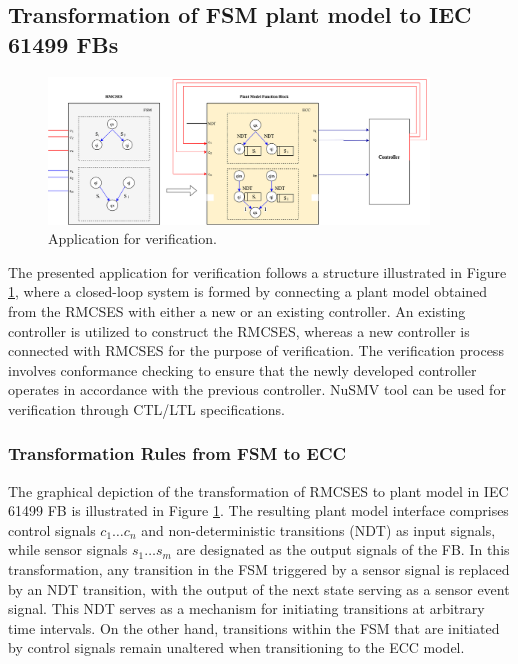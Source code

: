 \documentclass{ieeeojies}
\begin{document}
\subsection{Transformation of FSM plant model to IEC 61499 FBs }

\label{subsec:transformationOfFSMtoFB}

\begin{figure}[!t]
	\centering
	\includegraphics[width=0.9\textwidth]{images/VerificationApp1.png}
	\caption{Application for verification.}
	\label{verificationApp}
\end{figure}


The presented application for verification follows a structure illustrated in Figure \ref{verificationApp}, where a closed-loop system is formed by connecting a plant model obtained from the RMCSES with either a new or an existing controller. An existing controller is utilized to construct the RMCSES, whereas a new controller is connected with RMCSES for the purpose of verification. The verification process involves conformance checking to ensure that the newly developed controller operates in accordance with the previous controller. NuSMV tool can be used for verification through CTL/LTL specifications.





\subsubsection{Transformation Rules from FSM to ECC }



The graphical depiction of the transformation of RMCSES to plant model in IEC 61499 FB is illustrated in Figure \ref{verificationApp}. The resulting plant model interface comprises control signals $c_1 \dots c_n$ and non-deterministic transitions (NDT) as input signals, while sensor signals $s_1 \dots s_m$ are designated as the output signals of the FB. In this transformation, any transition in the FSM triggered by a sensor signal is replaced by an NDT transition, with the output of the next state serving as a sensor event signal. This NDT serves as a mechanism for initiating transitions at arbitrary time intervals.  On the other hand, transitions within the FSM that are initiated by control signals remain unaltered when transitioning to the ECC model.
\end{document}
